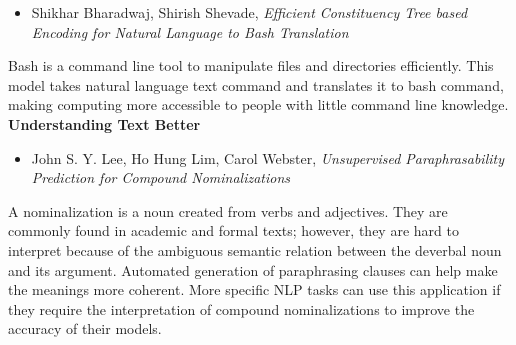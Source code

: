 \documentclass[11pt]{article}
\begin{document}
\begin{itemize}
\item Shikhar Bharadwaj, Shirish Shevade, \emph{Efficient Constituency Tree based Encoding for Natural Language to Bash Translation}
\end{itemize}
Bash is a command line tool to manipulate files and directories efficiently. This model takes natural language text command and translates it to bash command, making computing more accessible to people with little command line knowledge.
\\[12pt]
\noindent
\textbf{Understanding Text Better}
\begin{itemize}
\item John S. Y. Lee, Ho Hung Lim, Carol Webster, \emph{Unsupervised Paraphrasability Prediction for Compound Nominalizations}
\end{itemize}
A nominalization is a noun created from verbs and adjectives. They are commonly found in academic and formal texts; however, they are hard to interpret because of the ambiguous semantic relation between the deverbal noun and its argument. Automated generation of paraphrasing clauses can help make the meanings more coherent. More specific NLP tasks can use this application if they require the interpretation of compound nominalizations to improve the accuracy of their models. 
\end{document}
